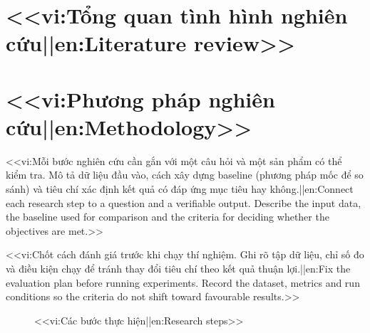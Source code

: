 \documentclass[12pt,a4paper]{article}
\begin{document}
\section{<<vi:Tổng quan tình hình nghiên cứu||en:Literature review>>}
\label{sec:review}

\section{<<vi:Phương pháp nghiên cứu||en:Methodology>>}
\label{sec:method}
<<vi:Mỗi bước nghiên cứu cần gắn với một câu hỏi và một sản phẩm có thể kiểm tra. Mô tả dữ liệu đầu vào, cách xây dựng baseline (phương pháp mốc để so sánh) và tiêu chí xác định kết quả có đáp ứng mục tiêu hay không.||en:Connect each research step to a question and a verifiable output. Describe the input data, the baseline used for comparison and the criteria for deciding whether the objectives are met.>>
\begin{keyidea}
<<vi:Chốt cách đánh giá trước khi chạy thí nghiệm. Ghi rõ tập dữ liệu, chỉ số đo và điều kiện chạy để tránh thay đổi tiêu chí theo kết quả thuận lợi.||en:Fix the evaluation plan before running experiments. Record the dataset, metrics and run conditions so the criteria do not shift toward favourable results.>>
\end{keyidea}
\begin{figure}[H]
  \centering
  \caption{<<vi:Các bước thực hiện||en:Research steps>>}
  \label{fig:method}
\end{figure}

\end{document}
